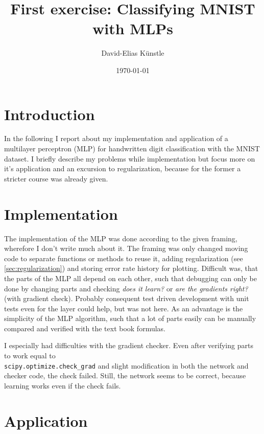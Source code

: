 \documentclass[a4paper,11pt]{article}
\begin{document}
\title{First exercise: Classifying MNIST with MLPs}
\author{David-Elias K\"unstle}
\date{\today}
\maketitle
\section{Introduction}

In the following I report about my implementation and application of a multilayer perceptron
(MLP) for handwritten digit classification with the MNIST dataset.
I briefly describe my problems while implementation but focus more on
it's application and an excursion to regularization, because for the former a
stricter course was already given.

\section{Implementation}

The implementation of the MLP was done according to the given framing, wherefore
I don't write much about it.
The framing was only changed moving code to separate functions or methods to
reuse it,
adding regularization (see \autoref{sec:regularization}) and storing error rate
history for plotting.
Difficult was, that the parts of the MLP all depend on each other, such that
debugging can only be done by changing parts and checking \emph{does it
  learn?} or \emph{are the gradients right?} (with gradient check).
Probably consequent test driven development with unit tests even for the layer
could help, but was not here.
As an advantage is the simplicity of the MLP algorithm, such that
a lot of parts easily can be manually compared and verified with the text book formulas.

I especially had difficulties with the gradient checker. Even after
verifying parts to work equal to \\ \texttt{scipy.optimize.check\_grad} and
slight modification in both the network and checker code, the check failed.
Still, the network seems to be correct, because learning works even if the check
fails.

\section{Application}
\end{document}
